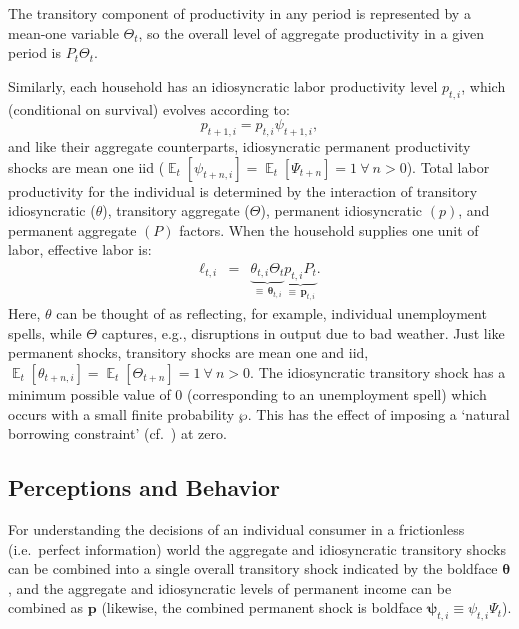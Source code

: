 \documentclass[titlepage]{article}
\DeclareMathOperator{\Ex}{\mathbb{E}} %
\begin{document}
The transitory component of productivity in any period is represented by a mean-one variable $\Theta_t$, so the overall level of aggregate productivity in a given period is $P_{t}\Theta_{t}$.

Similarly, each household has an idiosyncratic labor productivity level $p_{t,i}$, which (conditional on survival) evolves according to:
\begin{equation}
p_{t+1,i} = p_{t,i} \psi_{t+1,i},  \label{eq:IndRandWalk}
\end{equation}
and like their aggregate counterparts, idiosyncratic permanent productivity shocks are mean
one iid ($\Ex_{t}[\psi_{t+n,i}]=\Ex_{t}[\Psi_{t+n}]= 1~\forall ~n>0$).
Total labor productivity for the individual is determined by the interaction of transitory idiosyncratic
($\theta$), transitory aggregate ($\Theta$), permanent idiosyncratic $({p})$, and permanent aggregate
$({P})$ factors.  When the household supplies one unit of labor, effective labor is:
\begin{eqnarray}
  \label{eq:ell}
   \pmb{\ell}_{t,i} & = & \underbrace{\theta_{t,i}\Theta_{t}}_{\equiv\,\pmb{\theta}_{t,i}}\underbrace{{p}_{t,i} {P}_{t}}_{\equiv\,\pmb{p}_{t,i}}.
\end{eqnarray}
  Here, $\theta$ can be thought of as reflecting, for example, individual unemployment spells, while $\Theta$ captures, e.g., disruptions in output due to bad weather.  Just like permanent shocks, transitory shocks are mean one and iid, $\Ex_{t}[\theta_{t+n,i}]=\Ex_{t}[\Theta_{t+n}]=1~\forall~n>0$.  { The idiosyncratic transitory shock has a minimum possible value of 0 (corresponding to an unemployment spell) which occurs with a small finite probability $\wp$.  This has the effect of imposing a `natural borrowing constraint' (cf.\ \cite{zeldesStochastic}) at zero.}{}

\subsection{Perceptions and Behavior}

For understanding the decisions of an individual consumer in a frictionless (i.e.\ perfect information) world the aggregate and idiosyncratic transitory shocks can be combined into a single overall transitory shock indicated by the boldface $\pmb{\theta}$, and the aggregate and idiosyncratic levels of permanent income can be combined as $\pmb{p}$ (likewise, the combined permanent shock is boldface $\pmb{\psi}_{t,i}\equiv \psi_{t,i} \Psi_{t}$).
\end{document}
